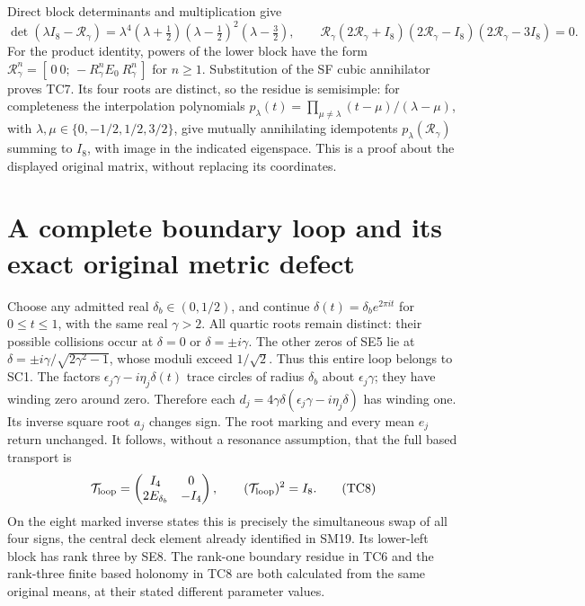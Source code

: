 \documentclass[11pt]{article}
\begin{document}
Direct block determinants and multiplication give
\[
 \det(\lambda I_8-\mathcal R_\gamma)
 =\lambda^4(\lambda+\tfrac12)
                  (\lambda-\tfrac12)^2(\lambda-\tfrac32),
 \qquad
 \mathcal R_\gamma(2\mathcal R_\gamma+I_8)
 (2\mathcal R_\gamma-I_8)(2\mathcal R_\gamma-3I_8)=0.
 \tag{TC7}
\]
For the product identity, powers of the lower block have the form
$\mathcal R_\gamma^n=[\,0\ 0;\,-R_\gamma^nE_0\ R_\gamma^n\,]$
for $n\ge1$. Substitution of the SF cubic annihilator proves TC7.
Its four roots are distinct, so the residue is semisimple: for
completeness the interpolation polynomials
$p_\lambda(t)=\prod_{\mu\ne\lambda}(t-\mu)/(\lambda-\mu)$,
with $\lambda,\mu\in\{0,-1/2,1/2,3/2\}$, give mutually
annihilating idempotents $p_\lambda(\mathcal R_\gamma)$ summing
to $I_8$, with image in the indicated eigenspace. This is a proof
about the displayed original matrix, without replacing its coordinates.

\section{A complete boundary loop and its exact original metric defect}
Choose any admitted real $\delta_b\in(0,1/2)$, and continue
$\delta(t)=\delta_b e^{2\pi it}$ for $0\le t\le1$, with the same
real $\gamma>2$. All quartic roots remain distinct: their possible
collisions occur at $\delta=0$ or $\delta=\pm i\gamma$. The other
zeros of SE5 lie at
$\delta=\pm i\gamma/\sqrt{2\gamma^2-1}$, whose moduli exceed
$1/\sqrt2$. Thus this entire loop belongs to SC1.
The factors
$\epsilon_j\gamma-i\eta_j\delta(t)$ trace circles of radius
$\delta_b$ about $\epsilon_j\gamma$; they have winding zero around
zero. Therefore each
$d_j=4\gamma\delta(\epsilon_j\gamma-i\eta_j\delta)$ has winding
one. Its inverse square root $a_j$ changes sign. The root marking
and every mean $e_j$ return unchanged. It follows, without a
resonance assumption, that the full based transport is
\[
 \mathcal T_{\rm loop}=
 \begin{pmatrix}I_4&0\\2E_{\delta_b}&-I_4\end{pmatrix},\qquad
 (\mathcal T_{\rm loop})^2=I_8.
 \tag{TC8}
\]
On the eight marked inverse states this is precisely the simultaneous
swap of all four signs, the central deck element already identified
in SM19. Its lower-left block has rank three by SE8. The rank-one
boundary residue in TC6 and the rank-three finite based holonomy in
TC8 are both calculated from the same original means, at their stated
different parameter values.
\end{document}
